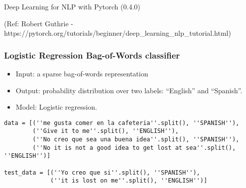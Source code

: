 \begin{frame}[fragile]\frametitle{}
\begin{center}
{\Large Deep Learning for NLP with Pytorch (0.4.0)}

(Ref:  Robert Guthrie -  https://pytorch.org/tutorials/beginner/deep\_learning\_nlp\_tutorial.html)
\end{center}
\end{frame}



\begin{frame}[fragile]
\frametitle{Logistic Regression Bag-of-Words classifier}

\begin{itemize}
\item Input: a sparse bag-of-words representation
\item Output: probability distribution over two labels: ``English'' and ``Spanish''. 
\item Model: Logistic regression.
\end{itemize}
 \begin{lstlisting}
data = [(''me gusta comer en la cafeteria''.split(), ''SPANISH''),
        (''Give it to me''.split(), ''ENGLISH''),
        (''No creo que sea una buena idea''.split(), ''SPANISH''),
        (''No it is not a good idea to get lost at sea''.split(), ''ENGLISH'')]

test_data = [(''Yo creo que si''.split(), ''SPANISH''),
             (''it is lost on me''.split(), ''ENGLISH'')]
\end{lstlisting}              
\end{frame} 



